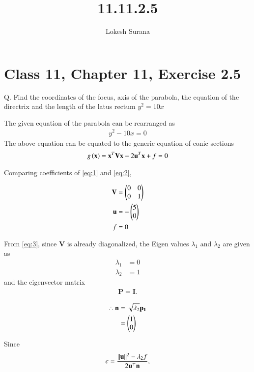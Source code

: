 \documentclass[journal,12pt,twocolumn]{IEEEtran}
\renewcommand{\vec}[1]{\boldsymbol{\mathbf{#1}}}
\begin{document}
\vspace{3cm}
\title{11.11.2.5}
\author{Lokesh Surana}
\maketitle
\section*{Class 11, Chapter 11, Exercise 2.5}

Q. Find the coordinates of the focus, axis of the parabola, the equation of the directrix and the length of the latus rectum $y^2 = 10x$

\solution
The given equation of the parabola can be rearranged as
\begin{align}
    \label{eq:1} y^2-10x = 0
\end{align}
The above equation can be equated to the generic equation of conic sections
\begin{align}
    \label{eq:2} g\brak{\vec{x}} = \vec{x}^T\vec{V}\vec{x} + 2\vec{u}^T\vec{x} + f = 0 
\end{align}

Comparing coefficients of \eqref{eq:1} and \eqref{eq:2},

\begin{align}
    \label{eq:3}
	\vec{V} &= \myvec{ 0 & 0 \\ 0 & 1} \\
	\label{eq:4}
	\vec{u} &= -\myvec{5 \\ 0} \\
	\label{eq:5}
	f &= 0 
\end{align}


From \eqref{eq:3}, since $\vec{V}$ is already diagonalized, the Eigen values $\lambda_1$ and $\lambda_2$ are given as 
\begin{align}
	\lambda_1 &= 0 \\
	\lambda_2 &= 1 
\end{align}
and the eigenvector matrix
\begin{align}
	\vec{P} = \vec{I}.
\end{align}

\begin{align}
	\therefore 
	\vec{n} &= \sqrt{\lambda_2}\vec{p_1} \\
	&= \myvec{1 \\ 0} 
\end{align}

Since
\begin{align}
	\label{eq:c}
	c = \frac{\norm{\vec{u}}^2-\lambda_2f}{2\vec{u}^\top\vec{n}},
\end{align}
\end{document}
